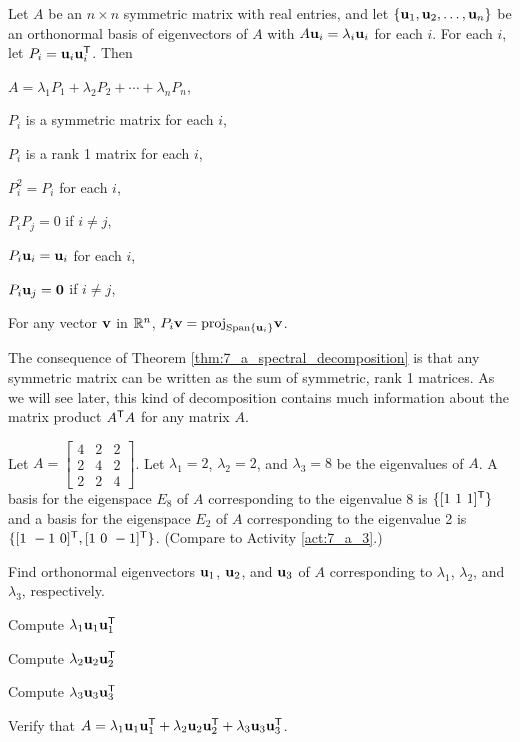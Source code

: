 \begin{theorem} \label{thm:7_a_spectral_decomposition} Let $A$ be an $n \times n$ symmetric matrix with real entries, and let $\{\mathbf{u}_1, \mathbf{u}_2, \ldots, \mathbf{u}_n\}$ be an orthonormal basis of eigenvectors of $A$ with $A \mathbf{u}_i = \lambda_i \mathbf{u}_i$ for each $i$. For each $i$, let $P_i = \mathbf{u}_i\mathbf{u}_i^{\mathsf{T}}$. Then
\be
\item $A = \lambda_1 P_1 + \lambda_2 P_2 + \cdots + \lambda_n P_n$,
\item $P_i$ is a symmetric matrix for each $i$,
\item $P_i$ is a rank 1 matrix for each $i$, 
\item $P_i^2 = P_i$ for each $i$,
\item $P_i P_j = 0$ if $i \neq j$,
\item $P_i \mathbf{u}_i = \mathbf{u}_i$ for each $i$,
\item $P_i \mathbf{u}_j = \mathbf{0}$ if $i \neq j$,
\item For any vector $\mathbf{v}$ in $\mathbb{R}^n$, $P_i \mathbf{v} = \text{proj}_{\text{Span}\{\mathbf{u}_i\}} \mathbf{v}$. 
\ee
\end{theorem}

The consequence of Theorem \ref{thm:7_a_spectral_decomposition} is that any symmetric matrix can be written as the sum of symmetric, rank 1 matrices. As we will see later, this kind of decomposition contains much information about the matrix product $A^{\mathsf{T}}A$ for any matrix $A$. 
 

\begin{activity} \label{act:7_a_4} Let $A = \left[ \begin{array}{ccc} 4&2&2 \\ 2&4&2 \\ 2&2&4 \end{array} \right]$. Let $\lambda_1 = 2$, $\lambda_2 = 2$, and $\lambda_3 = 8$ be the eigenvalues of $A$. A basis for the eigenspace $E_8$ of $A$ corresponding to the eigenvalue 8 is $\{[1 \ 1\ 1]^{\tr}\}$ and a basis for the eigenspace $E_2$ of $A$ corresponding to the eigenvalue 2 is $\{[1 \ -1\ 0]^{\tr}, [1 \ 0 \ -1]^{\tr}\}$. (Compare to Activity \ref{act:7_a_3}.)
	\ba
	\item Find orthonormal eigenvectors $\mathbf{u}_1$, $\mathbf{u}_2$, and $\mathbf{u}_3$ of $A$ corresponding to $\lambda_1$, $\lambda_2$, and $\lambda_3$, respectively.
	
	\item Compute $\lambda_1 \mathbf{u}_1\mathbf{u}_1^{\mathsf{T}}$
	
	
	\item Compute $\lambda_2 \mathbf{u}_2\mathbf{u}_2^{\mathsf{T}}$
	
	
	\item Compute $\lambda_3 \mathbf{u}_3\mathbf{u}_3^{\mathsf{T}}$
	
	
	\item Verify that $A = \lambda_1 \mathbf{u}_1\mathbf{u}_1^{\mathsf{T}} + \lambda_2 \mathbf{u}_2\mathbf{u}_2^{\mathsf{T}} + \lambda_3 \mathbf{u}_3\mathbf{u}_3^{\mathsf{T}}$.
	
	\ea
\end{activity}

